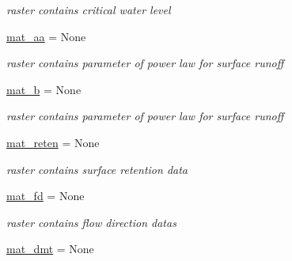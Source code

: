 \begin{DoxyCompactItemize}
\begin{DoxyCompactList}\small\item\em raster contains critical water level \end{DoxyCompactList}\item 
\hypertarget{classmain__src_1_1main__classes_1_1General_1_1Globals_a94b877cb0a62e6b2179f10ed17caffcc}{\hyperlink{classmain__src_1_1main__classes_1_1General_1_1Globals_a94b877cb0a62e6b2179f10ed17caffcc}{mat\-\_\-aa} = None}\label{classmain__src_1_1main__classes_1_1General_1_1Globals_a94b877cb0a62e6b2179f10ed17caffcc}

\begin{DoxyCompactList}\small\item\em raster contains parameter of power law for surface runoff \end{DoxyCompactList}\item 
\hypertarget{classmain__src_1_1main__classes_1_1General_1_1Globals_a5bd79a8f79fcb14fe799dedde10c6f82}{\hyperlink{classmain__src_1_1main__classes_1_1General_1_1Globals_a5bd79a8f79fcb14fe799dedde10c6f82}{mat\-\_\-b} = None}\label{classmain__src_1_1main__classes_1_1General_1_1Globals_a5bd79a8f79fcb14fe799dedde10c6f82}

\begin{DoxyCompactList}\small\item\em raster contains parameter of power law for surface runoff \end{DoxyCompactList}\item 
\hypertarget{classmain__src_1_1main__classes_1_1General_1_1Globals_a8e9b65ec0ce7be0babe65bc4a1184fb9}{\hyperlink{classmain__src_1_1main__classes_1_1General_1_1Globals_a8e9b65ec0ce7be0babe65bc4a1184fb9}{mat\-\_\-reten} = None}\label{classmain__src_1_1main__classes_1_1General_1_1Globals_a8e9b65ec0ce7be0babe65bc4a1184fb9}

\begin{DoxyCompactList}\small\item\em raster contains surface retention data \end{DoxyCompactList}\item 
\hypertarget{classmain__src_1_1main__classes_1_1General_1_1Globals_a47a630fc018728049fc2d2aad962108c}{\hyperlink{classmain__src_1_1main__classes_1_1General_1_1Globals_a47a630fc018728049fc2d2aad962108c}{mat\-\_\-fd} = None}\label{classmain__src_1_1main__classes_1_1General_1_1Globals_a47a630fc018728049fc2d2aad962108c}

\begin{DoxyCompactList}\small\item\em raster contains flow direction datas \end{DoxyCompactList}\item 
\hypertarget{classmain__src_1_1main__classes_1_1General_1_1Globals_a2dfd5f2e7620ee9d6f32634443a368ce}{\hyperlink{classmain__src_1_1main__classes_1_1General_1_1Globals_a2dfd5f2e7620ee9d6f32634443a368ce}{mat\-\_\-dmt} = None}\label{classmain__src_1_1main__classes_1_1General_1_1Globals_a2dfd5f2e7620ee9d6f32634443a368ce}


\end{DoxyCompactItemize}
